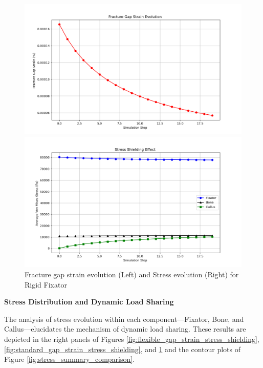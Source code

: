 \documentclass{article}
\begin{document}
\begin{figure}[H]
  \centering
  \begin{minipage}{0.45\textwidth}
    \centering
    \includegraphics[width=\textwidth]{../output_advanced/Rigid/gap_strain.png}
  \end{minipage}
  \hfill
  \begin{minipage}{0.45\textwidth}
    \centering
    \includegraphics[width=\textwidth]{../output_advanced/Rigid/stress_shielding.png}
  \end{minipage}
  \caption{Fracture gap strain evolution (Left) and Stress evolution (Right) for Rigid Fixator}
  \label{fig:rigid_gap_strain_stress_shielding}
\end{figure}


\textbf{Stress Distribution and Dynamic Load Sharing}

The analysis of stress evolution within each component—Fixator, Bone, and Callus—elucidates the mechanism of dynamic load sharing. These results are depicted in the right panels of Figures \ref{fig:flexible_gap_strain_stress_shielding}, \ref{fig:standard_gap_strain_stress_shielding}, and \ref{fig:rigid_gap_strain_stress_shielding} and the contour plots of Figure \ref{fig:stress_summary_comparison}.
\end{document}
